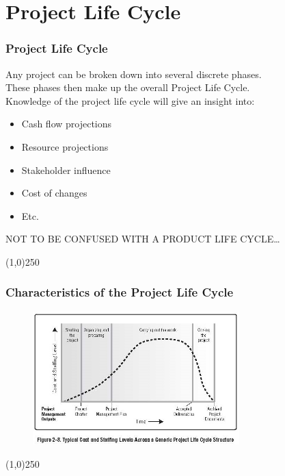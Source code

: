 \section{Project Life Cycle}


\begin{frame}
\frametitle{Project Life Cycle}
Any project can be broken down into several discrete phases.\\
These phases then make up the overall Project Life Cycle.\\
Knowledge of the project life cycle will give an insight into:\\
\begin{itemize}
	\item Cash flow projections
	\item Resource projections
	\item Stakeholder influence
	\item Cost of changes
	\item Etc.
\end{itemize}
NOT TO BE CONFUSED WITH A PRODUCT LIFE CYCLE\ldots\\
\end{frame}
\begin{center}\line(1,0){250}\end{center}



\begin{frame}
\frametitle{Characteristics of the Project Life Cycle}
 \begin{figure}
 	\centering
 		\includegraphics[width = 8cm]{images/Fig2-8.jpg}
 	\label{fig:2-8}
 \end{figure}
\end{frame}
\begin{center}\line(1,0){250}\end{center}




